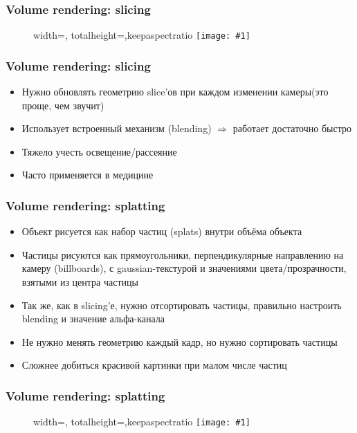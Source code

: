 \documentclass{beamer}
\newcommand{\slideimage}[1]{
  \begin{figure}
    \begin{adjustbox}{width=\textwidth, totalheight=\textheight-2\baselineskip-2\baselineskip,keepaspectratio}
      \texttt{[image: \#1]}
    \end{adjustbox}
  \end{figure}
}
\begin{document}
\begin{frame}[fragile]
\frametitle{Volume rendering: slicing}
\slideimage{slicing.jpg}
\end{frame}

\begin{frame}[fragile]
\frametitle{Volume rendering: slicing}
\begin{itemize}
\item Нужно обновлять геометрию slice'ов при каждом изменении камеры\pause (это проще, чем звучит)
\pause
\item Использует встроенный механизм (blending) \begin{math}\Rightarrow\end{math} работает достаточно быстро
\pause
\item Тяжело учесть освещение/рассеяние
\pause
\item Часто применяется в медицине
\end{itemize}
\end{frame}

\begin{frame}[fragile]
\frametitle{Volume rendering: splatting}
\begin{itemize}
\item Объект рисуется как набор частиц (splats) внутри объёма объекта
\pause
\item Частицы рисуются как прямоугольники, перпендикулярные направлению на камеру (billboards), с gaussian-текстурой и значениями цвета/прозрачности, взятыми из центра частицы
\pause
\item Так же, как в slicing'е, нужно отсортировать частицы, правильно настроить blending и значение альфа-канала
\pause
\item Не нужно менять геометрию каждый кадр, но нужно сортировать частицы
\pause
\item Сложнее добиться красивой картинки при малом числе частиц
\end{itemize}
\end{frame}

\begin{frame}[fragile]
\frametitle{Volume rendering: splatting}
\slideimage{splatting-scheme.png}
\end{frame}
\end{document}
